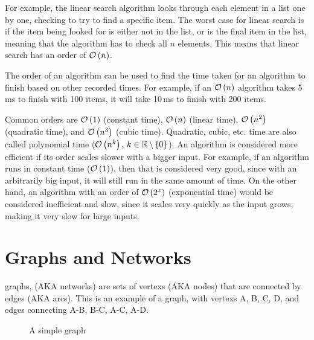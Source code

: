         For example, the linear search \gls{algorithm} looks through each element in a list one by one, checking to try to find a specific item.
        The worst case for linear search is if the item being looked for is either not in the list, or is the final item in the list, meaning that the \gls{algorithm} has to check all $n$ elements.
        This means that linear search has an order of $\mathcal{O}\left(n\right)$.

        The order of an \gls{algorithm} can be used to find the time taken for an \gls{algorithm} to finish based on other recorded times. For example, if an $\mathcal{O}\left(n\right)$ algorithm takes 5\,ms to finish with 100 items, it will take 10\,ms to finish with 200 items.
        
        Common orders are $\mathcal{O}\left(1\right)$ (constant time), $\mathcal{O}\left(n\right)$ (linear time), $\mathcal{O}\left(n^2\right)$ \\ (quadratic time), and $\mathcal{O}\left(n^3\right)$ (cubic time).
        Quadratic, cubic, etc. time are also called polynomial time ($\mathcal{O}\left(n^k\right),\,k\in\operatorname{\mathbb{R}}\setminus\left\{0\right\}$).
        An \gls{algorithm} is considered more efficient if its order scales slower with a bigger input.
        For example, if an \gls{algorithm} runs in constant time ($\mathcal{O}\left(1\right)$), then that is considered very good, since with an arbitrarily big input, it will still run in the same amount of time.
        On the other hand, an \gls{algorithm} with an order of $\mathcal{O}\left(2^x\right)$ (exponential time) would be considered inefficient and slow, since it scales very quickly as the input grows, making it very slow for large inputs.
    \newpage

\section{Graphs and Networks} \label{graphs_and_networks}
    \Glspl{graph}, (AKA networks) are sets of \glspl{vertex} (AKA nodes) that are connected by \glspl{edge} (AKA arcs).
    This is an example of a \gls{graph}, with \glspl{vertex} A, B, C, D, and edges connecting A-B, B-C, A-C, A-D.

    \begin{figure}
        \centering
        \caption{A simple graph}
        \label{fig:simple_graph}
    \end{figure}

